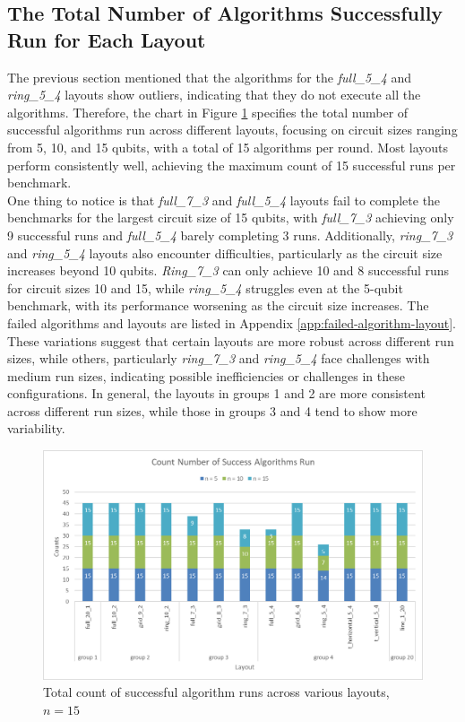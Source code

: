 \subsection{The Total Number of Algorithms Successfully Run for Each Layout}
The previous section mentioned that the algorithms for the \textit{full\_5\_4} and \textit{ring\_5\_4} layouts show outliers, indicating that they do not execute all the algorithms. Therefore, the chart in Figure \ref{fig:chart-success-algorithm-run} specifies the total number of successful algorithms run across different layouts, focusing on circuit sizes ranging from 5, 10, and 15 qubits, with a total of 15 algorithms per round. Most layouts perform consistently well, achieving the maximum count of 15 successful runs per benchmark. \\
One thing to notice is that \textit{full\_7\_3} and \textit{full\_5\_4}  layouts fail to complete the benchmarks for the largest circuit size of 15 qubits, with \textit{full\_7\_3} achieving only 9 successful runs and \textit{full\_5\_4} barely completing 3 runs. Additionally, \textit{ring\_7\_3} and \textit{ring\_5\_4} layouts also encounter difficulties, particularly as the circuit size increases beyond 10 qubits. \textit{Ring\_7\_3} can only achieve 10 and 8 successful runs for circuit sizes 10 and 15, while \textit{ring\_5\_4} struggles even at the 5-qubit benchmark, with its performance worsening as the circuit size increases. The failed algorithms and layouts are listed in Appendix \ref{app:failed-algorithm-layout}. \\
These variations suggest that certain layouts are more robust across different run sizes, while others, particularly \textit{ring\_7\_3} and \textit{ring\_5\_4} face challenges with medium run sizes, indicating possible inefficiencies or challenges in these configurations. In general, the layouts in groups 1 and 2 are more consistent across different run sizes, while those in groups 3 and 4 tend to show more variability.
\begin{figure}[htb]
    \centering
    \includegraphics[width=0.8\linewidth]{image/chart_success_algorithm_run.png}
    \caption{Total count of successful algorithm runs across various layouts, $n = 15$}
    \label{fig:chart-success-algorithm-run}
\end{figure}

